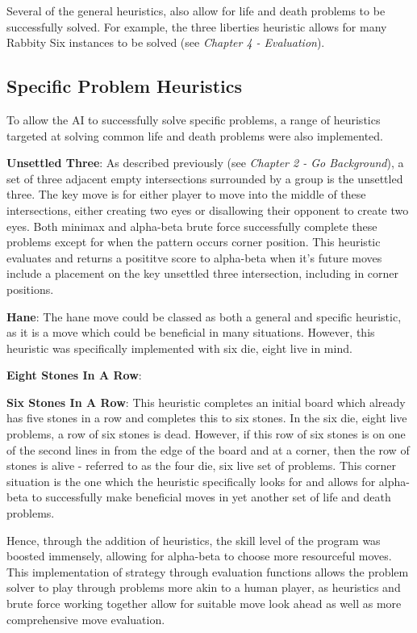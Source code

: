 \documentclass{l3proj}
\begin{document}
Several of the general heuristics, also allow for life and death problems to be successfully solved. For example, the three liberties heuristic allows for many Rabbity Six instances to be solved (see \textit{Chapter 4 - Evaluation}).

\subsection{Specific Problem Heuristics}

To allow the AI to successfully solve specific problems, a range of heuristics targeted at solving common life and death problems were also implemented.

\textbf{Unsettled Three}: As described previously (see \textit{Chapter 2 - Go Background}), a set of three adjacent empty intersections surrounded by a group is the unsettled three. The key move is for either player to move into the middle of these intersections, either creating two eyes or disallowing their opponent to create two eyes. Both minimax and alpha-beta brute force successfully complete these problems except for when the pattern occurs corner position. This heuristic evaluates and returns a posititve score to alpha-beta when it's future moves include a placement on the key unsettled three intersection, including in corner positions.

\textbf{Hane}: The hane move could be classed as both a general and specific heuristic, as it is a move which could be beneficial in many situations. However, this heuristic was specifically implemented with six die, eight live in mind.

\textbf{Eight Stones In A Row}:

\textbf{Six Stones In A Row}: This heuristic completes an initial board which already has five stones in a row and completes this to six stones. In the six die, eight live problems, a row of six stones is dead. However, if this row of six stones is on one of the second lines in from the edge of the board and at a corner, then the row of stones is alive - referred to as the four die, six live set of problems. This corner situation is the one which the heuristic specifically looks for and allows for alpha-beta to successfully make beneficial moves in yet another set of life and death problems.

Hence, through the addition of heuristics, the skill level of the program was boosted immensely, allowing for alpha-beta to choose more resourceful moves. This implementation of strategy through evaluation functions allows the problem solver to play through problems more akin to a human player, as heuristics and brute force working together allow for suitable move look ahead as well as more comprehensive move evaluation.
\end{document}
